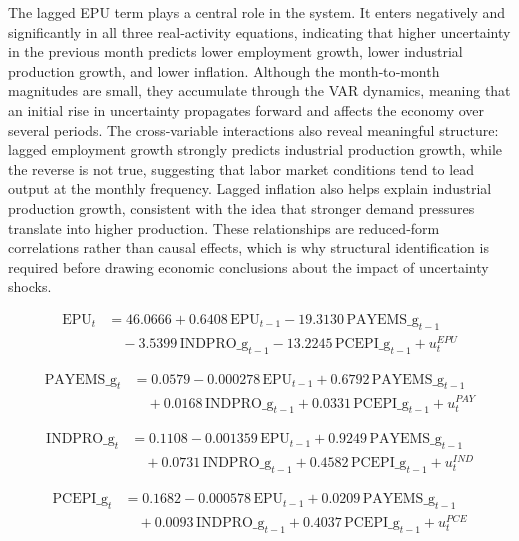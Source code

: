 \documentclass[11pt]{article}
\begin{document}
The lagged EPU term plays a central role in the system. It enters negatively and significantly in all three real‑activity equations, 
indicating that higher uncertainty in the previous month predicts lower employment growth, lower industrial production growth, and 
lower inflation. Although the month‑to‑month magnitudes are small, they accumulate through the VAR dynamics, meaning that an initial 
rise in uncertainty propagates forward and affects the economy over several periods. The cross‑variable interactions also reveal 
meaningful structure: lagged employment growth strongly predicts industrial production growth, while the reverse is not true, 
suggesting that labor market conditions tend to lead output at the monthly frequency. Lagged inflation also helps explain industrial 
production growth, consistent with the idea that stronger demand pressures translate into higher production. These relationships are 
reduced‑form correlations rather than causal effects, which is why structural identification is required before drawing economic 
conclusions about the impact of uncertainty shocks.

{\small
\begin{align}
\text{EPU}_t
&= 46.0666
+ 0.6408\, \text{EPU}_{t-1}
- 19.3130\, \text{PAYEMS\_g}_{t-1} \nonumber \\
&\quad
- 3.5399\, \text{INDPRO\_g}_{t-1}
- 13.2245\, \text{PCEPI\_g}_{t-1}
+ u^{EPU}_t
\end{align}

\begin{align}
\text{PAYEMS\_g}_t
&= 0.0579
- 0.000278\, \text{EPU}_{t-1}
+ 0.6792\, \text{PAYEMS\_g}_{t-1} \nonumber \\
&\quad
+ 0.0168\, \text{INDPRO\_g}_{t-1}
+ 0.0331\, \text{PCEPI\_g}_{t-1}
+ u^{PAY}_t
\end{align}

\begin{align}
\text{INDPRO\_g}_t
&= 0.1108
- 0.001359\, \text{EPU}_{t-1}
+ 0.9249\, \text{PAYEMS\_g}_{t-1} \nonumber \\
&\quad
+ 0.0731\, \text{INDPRO\_g}_{t-1}
+ 0.4582\, \text{PCEPI\_g}_{t-1}
+ u^{IND}_t
\end{align}

\begin{align}
\text{PCEPI\_g}_t
&= 0.1682
- 0.000578\, \text{EPU}_{t-1}
+ 0.0209\, \text{PAYEMS\_g}_{t-1} \nonumber \\
&\quad
+ 0.0093\, \text{INDPRO\_g}_{t-1}
+ 0.4037\, \text{PCEPI\_g}_{t-1}
+ u^{PCE}_t
\end{align}
}
\end{document}
